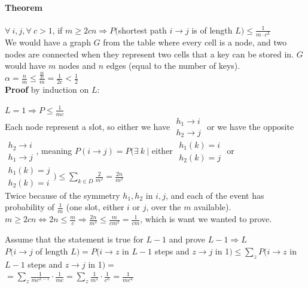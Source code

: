 \documentclass[10pt]{report}
\begin{document}
\paragraph{Theorem} $\forall\:i,j, \forall\:c>1$, if $m\geq 2cn \Rightarrow P($shortest path $i\rightarrow j$ is of length $L)\leq \frac{1}{m\cdot c^L}$\\
We would have a graph $G$ from the table where every cell is a node, and two nodes are connected when they represent two cells that a key can be stored in. $G$ would have $m$ nodes and $n$ edges (equal to the number of keys).\\
$\alpha=\frac{n}{m} \leq \frac{\frac{m}{2c}}{m} = \frac{1}{2c} < \frac{1}{2}$\\
\textbf{Proof} by induction on $L$:
\begin{list}{}{}
	\item $L = 1\Rightarrow P \leq \frac{1}{mc}$\\
	Each node represent a slot, so either we have $\begin{array}{l}
	 h_1 \rightarrow i\\h_2 \rightarrow j
\end{array}$ or we have the opposite $\begin{array}{l}
	 h_2 \rightarrow i\\h_1 \rightarrow j
\end{array}$, meaning $P(i\rightarrow j) = P(\exists\:k\:|$ either $\begin{array}{l}
	 h_1(k) =i\\h_2(k)=j
\end{array}$ or $\begin{array}{l}
	 h_1(k) = j\\h_2(k)=i
\end{array}) \leq \sum_{k\in D} \frac{2}{m^2} = \frac{2n}{m^2}$\\
Twice because of the symmetry $h_1,h_2$ in $i,j$, and each of the event has probability of $\frac{1}{m}$ (one slot, either $i$ or $j$, over the $m$ available).\\
	$m\geq 2cn \Leftrightarrow 2n\leq \frac{m}{c} \Rightarrow \frac{2n}{m^2} \leq \frac{m}{cm^2} = \frac{1}{cm}$, which is want we wanted to prove.
	\item Assume that the statement is true for $L-1$ and prove $L-1\Rightarrow L$\\
	$P(i\rightarrow j$ of length $L) = P(i\rightarrow z$ in $L-1$ steps and $z\rightarrow j$ in 1$) \leq \sum_z P(i\rightarrow z$ in $L-1$ steps and $z\rightarrow j$ in 1$)=$\\$=\sum_z \frac{1}{mc^{L-1}} \cdot \frac{1}{mc} = \sum_z \frac{1}{m^2}\cdot\frac{1}{c^L} =\frac{1}{mc^L}$
\end{list}
\end{document}
